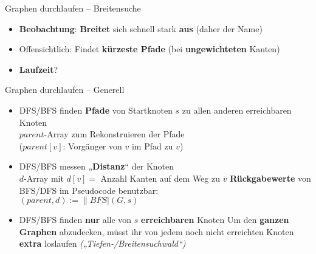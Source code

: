 \begin{frame}{Graphen durchlaufen – Breitensuche}
	\begin{itemize}
		\item<+-> \textbf{Beobachtung}: \textbf{Breitet} sich schnell stark \textbf{aus} (daher der Name)
		\item<+-> Offensichtlich: Findet \textbf{kürzeste Pfade} (bei \textbf{ungewichteten} Kanten)
		\item<+-> \textbf{Laufzeit}? \visible<+->{$\Theta(n+m)$} \\ 
	\end{itemize}
\end{frame}

\begin{frame}{Graphen durchlaufen – Generell}
	\begin{itemize}
		\item DFS/BFS finden \textbf{Pfade} von Startknoten $s$ zu allen anderen erreichbaren Knoten \\
		\impl $parent$-Array zum Rekonstruieren der Pfade \\
		{\small ($parent[v]$: Vorgänger von $v$ im Pfad zu $v$)}
		\item DFS/BFS messen „\textbf{Distanz}“ der Knoten \\
		\impl $d$-Array mit $d[v] = $ Anzahl Kanten auf dem Weg zu $v$ 
		\implitem \textbf{Rückgabewerte} von BFS/DFS im Pseudocode benutzbar: \\
		$(parent, d) := \|BFS|(G, s)$  \\
		\bigskip
		\pause
		\item DFS/BFS finden \textbf{nur} alle von $s$ \textbf{erreichbaren} Knoten
		\implitem Um den \textbf{ganzen Graphen} abzudecken, müsst ihr von jedem noch nicht erreichten Knoten \textbf{extra} loslaufen \: \emph{(„Tiefen-/Breitensuchwald“)}
	\end{itemize}
\end{frame}

